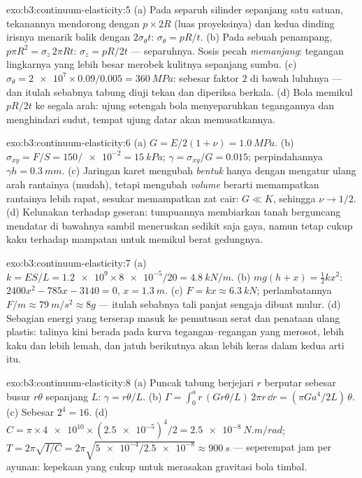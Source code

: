 \begin{solution}{exo:b3:continuum-elasticity:5}
(a) Pada separuh silinder sepanjang satu satuan, tekanannya mendorong
dengan $p
\times 2R$ (luas proyeksinya) dan kedua dinding irisnya menarik balik
dengan $2\sigma_\theta t$: $\sigma_\theta = pR/t$. (b) Pada sebuah
penampang, $p\pi R^2 = \sigma_z\,2\pi Rt$: $\sigma_z = pR/2t$ ---
separuhnya. Sosis pecah \emph{memanjang}: tegangan lingkarnya yang lebih
besar merobek kulitnya sepanjang sumbu. (c) $\sigma_\theta = \num{2e7} \times
0.09/0.005 = \qty{360}{MPa}$: sebesar faktor $2$ di bawah luluhnya ---
dan itulah sebabnya tabung diuji tekan dan diperiksa berkala. (d) Bola
memikul $pR/2t$ ke segala arah: ujung setengah bola menyeparuhkan
tegangannya dan menghindari sudut, tempat ujung datar akan memusatkannya.
\end{solution}

\begin{solution}{exo:b3:continuum-elasticity:6}
(a) $G = E/2(1 + \nu) = \qty{1.0}{MPa}$. (b) $\sigma_{xy} = F/S =
150/\num{e-2} = \qty{15}{kPa}$; $\gamma = \sigma_{xy}/G = 0.015$;
perpindahannya $\gamma h = \qty{0.3}{mm}$. (c) Jaringan karet mengubah
\emph{bentuk} hanya dengan mengatur ulang arah rantainya (mudah),
tetapi mengubah \emph{volume} berarti memampatkan rantainya lebih rapat,
sesukar memampatkan zat cair: $G \ll K$, sehingga $\nu \to 1/2$. (d)
Kelunakan terhadap geseran: tumpuannya membiarkan tanah berguncang
mendatar di bawahnya sambil meneruskan sedikit saja gaya, namun tetap
cukup kaku terhadap mampatan untuk memikul berat gedungnya.
\end{solution}

\begin{solution}{exo:b3:continuum-elasticity:7}
(a) $k = ES/L = \num{1.2e9} \times \num{8e-5}/20 = \qty{4.8}{kN/m}$.
(b) $mg(h + x) = \tfrac12 kx^2$: $2400x^2 - 785x - 3140 = 0$, $x =
\qty{1.3}{m}$. (c) $F = kx \approx \qty{6.3}{kN}$; perlambatannya $F/m
\approx \qty{79}{m/s^2} \approx 8g$ --- itulah sebabnya tali panjat
sengaja dibuat mulur. (d) Sebagian energi yang terserap masuk ke
pemutusan serat dan penataan ulang plastis: talinya kini berada pada
kurva tegangan--regangan yang merosot, lebih kaku dan lebih lemah, dan
jatuh berikutnya akan lebih keras dalam kedua arti itu.
\end{solution}

\begin{solution}{exo:b3:continuum-elasticity:8}
(a) Puncak tabung berjejari $r$ berputar sebesar busur $r\theta$
sepanjang $L$: $\gamma = r\theta/L$. (b) $\Gamma = \int_0^a r\,(G r\theta/L)\,
2\pi r\,\dd r = (\pi Ga^4/2L)\,\theta$. (c) Sebesar $2^4 = 16$. (d) $C =
\pi \times \num{4e10} \times (\num{2.5e-5})^4/2 =
\qty{2.5e-8}{N.m/rad}$; $T = 2\pi\sqrt{I/C} = 2\pi\sqrt{\num{5e-4}/
\num{2.5e-8}} \approx \qty{900}{s}$ --- seperempat jam per ayunan:
kepekaan yang cukup untuk merasakan gravitasi bola timbal.
\end{solution}

